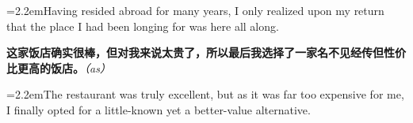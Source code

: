 \documentclass[11pt,a4paper]{article}
\newcommand{\num}[1]{\makebox[1.9em][r]{#1.}\hspace{0.3em}}
\newcommand{\prompt}[1]{\emph{\textcolor{tipblue}{\small（#1）}}}
\begin{document}
\noindent\hangindent=2.2em\hspace{2.2em}Having resided abroad for many years, I only realized upon my return that the place I had been longing for was here all along.

\num{5}\textbf{这家饭店确实很棒，但对我来说太贵了，所以最后我选择了一家名不见经传但性价比更高的饭店。}\prompt{as}

\vspace{0.15em}

\noindent\hangindent=2.2em\hspace{2.2em}The restaurant was truly excellent, but as it was far too expensive for me, I finally opted for a little-known yet a better-value alternative.
\end{document}

